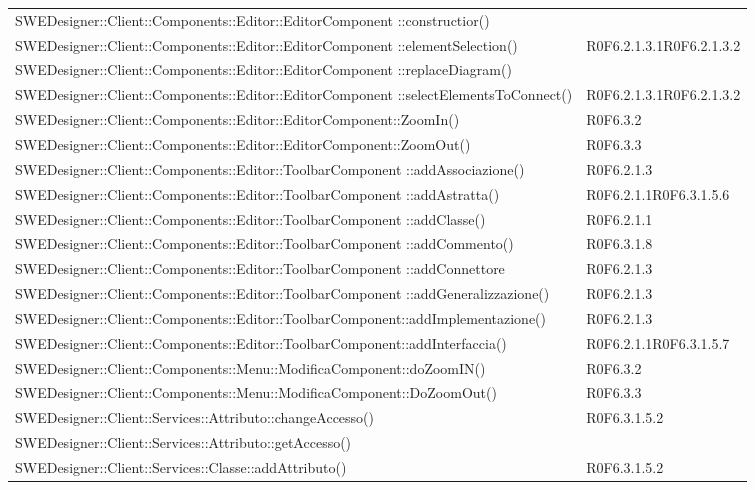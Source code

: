 \begin{center}
\begin{longtable}{p{13cm}!{\VRule[1pt]}p{2cm}}
SWEDesigner::Client::Components::Editor::EditorComponent ::constructior() & \\
SWEDesigner::Client::Components::Editor::EditorComponent ::elementSelection() & R0F6.2.1.3.1\newline R0F6.2.1.3.2\\
SWEDesigner::Client::Components::Editor::EditorComponent ::replaceDiagram() & \\
SWEDesigner::Client::Components::Editor::EditorComponent ::selectElementsToConnect() & R0F6.2.1.3.1\newline R0F6.2.1.3.2\\
SWEDesigner::Client::Components::Editor::EditorComponent::ZoomIn() & R0F6.3.2\\
SWEDesigner::Client::Components::Editor::EditorComponent::ZoomOut() & R0F6.3.3\\
SWEDesigner::Client::Components::Editor::ToolbarComponent ::addAssociazione() & R0F6.2.1.3\\
SWEDesigner::Client::Components::Editor::ToolbarComponent ::addAstratta() & R0F6.2.1.1\newline R0F6.3.1.5.6\\
SWEDesigner::Client::Components::Editor::ToolbarComponent ::addClasse() & R0F6.2.1.1\\
SWEDesigner::Client::Components::Editor::ToolbarComponent ::addCommento() & R0F6.3.1.8\\
SWEDesigner::Client::Components::Editor::ToolbarComponent ::addConnettore & R0F6.2.1.3\\
SWEDesigner::Client::Components::Editor::ToolbarComponent ::addGeneralizzazione() & R0F6.2.1.3\\
SWEDesigner::Client::Components::Editor::ToolbarComponent::addImplementazione() & R0F6.2.1.3\\
SWEDesigner::Client::Components::Editor::ToolbarComponent::addInterfaccia() & R0F6.2.1.1\newline R0F6.3.1.5.7\\
SWEDesigner::Client::Components::Menu::ModificaComponent::doZoomIN() & R0F6.3.2\\
SWEDesigner::Client::Components::Menu::ModificaComponent::DoZoomOut() & R0F6.3.3\\
SWEDesigner::Client::Services::Attributo::changeAccesso() & R0F6.3.1.5.2\\
SWEDesigner::Client::Services::Attributo::getAccesso() & \\
SWEDesigner::Client::Services::Classe::addAttributo() & R0F6.3.1.5.2\\

\end{longtable}
\end{center}
